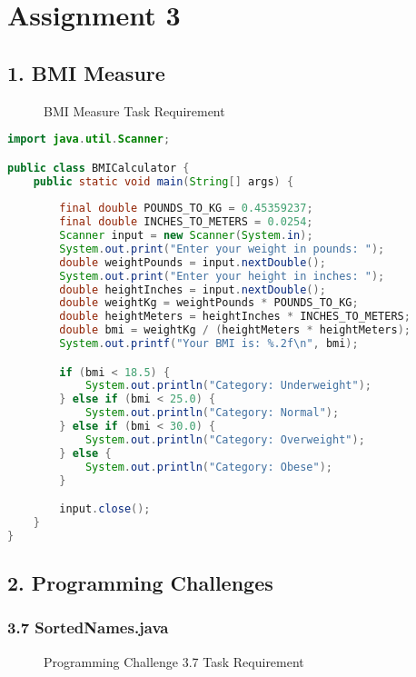 \documentclass{article}
\begin{document}
\section*{Assignment 3}

\subsection*{1. BMI Measure}

\begin{figure}[h]
    \centering
    \caption{BMI Measure Task Requirement}
\end{figure}

\begin{lstlisting}[language=Java, caption=BMICalculator.java]
import java.util.Scanner;

public class BMICalculator {
    public static void main(String[] args) {
        
        final double POUNDS_TO_KG = 0.45359237;
        final double INCHES_TO_METERS = 0.0254;
        Scanner input = new Scanner(System.in);
        System.out.print("Enter your weight in pounds: ");
        double weightPounds = input.nextDouble();
        System.out.print("Enter your height in inches: ");
        double heightInches = input.nextDouble();
        double weightKg = weightPounds * POUNDS_TO_KG;
        double heightMeters = heightInches * INCHES_TO_METERS;
        double bmi = weightKg / (heightMeters * heightMeters);
        System.out.printf("Your BMI is: %.2f\n", bmi);

        if (bmi < 18.5) {
            System.out.println("Category: Underweight");
        } else if (bmi < 25.0) {
            System.out.println("Category: Normal");
        } else if (bmi < 30.0) {
            System.out.println("Category: Overweight");
        } else {
            System.out.println("Category: Obese");
        }

        input.close();
    }
}
\end{lstlisting}

\subsection*{2. Programming Challenges}

\subsubsection*{3.7 SortedNames.java}

\begin{figure}[h]
    \centering
    \caption{Programming Challenge 3.7 Task Requirement}
\end{figure}
\end{document}
